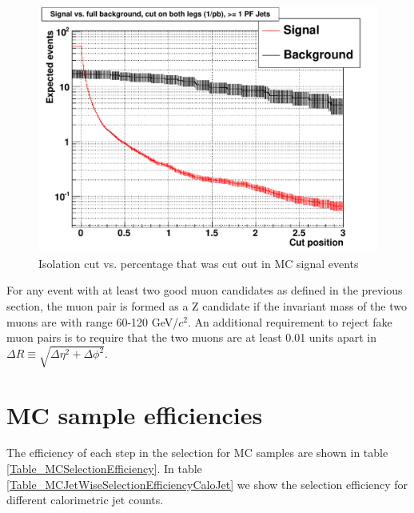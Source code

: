 \documentclass{cmspaper2}
\begin{document}
\begin{figure}[hbtp]
\begin{center}
\includegraphics[width=150mm]{DoubleLeg_WithQCD_1PFJet}
\caption{Isolation cut vs. percentage that was cut out in MC signal events}
\label{Figure_IsolationCutVsRejectionPercentage}
\end{center}
\end{figure}

For any event with at least two good muon candidates as defined in the previous section, the muon pair is formed as a Z candidate if
the invariant mass of the two muons are with range 60-120 GeV/$c^2$.  An additional requirement to reject fake muon pairs is to require
that the two muons are at least 0.01 units apart in $\Delta R \equiv \sqrt{\Delta\eta^2 + \Delta\phi^2}$.

\section{MC sample efficiencies}

The efficiency of each step in the selection for MC samples are shown in table \ref{Table_MCSelectionEfficiency}.
In table \ref{Table_MCJetWiseSelectionEfficiencyCaloJet} we show the selection efficiency for different calorimetric jet counts.
\end{document}
